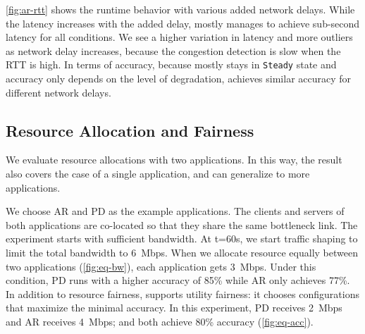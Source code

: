 \autoref{fig:ar-rtt} shows the runtime behavior with various added network
delays. While the latency increases with the added delay, \sysname{} mostly
manages to achieve sub-second latency for all conditions. We see a higher
variation in latency and more outliers as network delay increases, because the
congestion detection is slow when the RTT is high. In terms of accuracy, because
\sysname{} mostly stays in \texttt{Steady} state and accuracy only depends on
the level of degradation, \sysname{} achieves similar accuracy for different
network delays.

\subsection{Resource Allocation and Fairness}
\label{sec:multi-task-alloc}

We evaluate resource allocations with two applications. In this way, the result
also covers the case of a single application, and can generalize to more
applications.

We choose AR and PD as the example applications.  The clients and servers of
both applications are co-located so that they share the same bottleneck
link. The experiment starts with sufficient bandwidth. At t=60s, we start
traffic shaping to limit the total bandwidth to \SI{6}{Mbps}. When we allocate
resource equally between two applications (\autoref{fig:eq-bw}), each
application gets \SI{3}{Mbps}. Under this condition, PD runs with a higher
accuracy of 85\% while AR only achieves 77\%. In addition to resource fairness,
\sysname{} supports utility fairness: it chooses configurations that maximize
the minimal accuracy. In this experiment, PD receives \SI{2}{Mbps} and AR
receives \SI{4}{Mbps}; and both achieve 80\% accuracy (\autoref{fig:eq-acc}).

